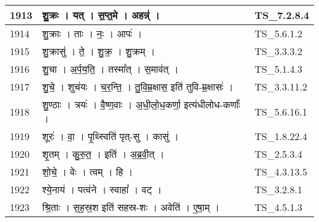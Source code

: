 \documentclass[17pt]{extarticle}
\begin{document}
\begin{longtable}{||p{0.4in}||p{4.9in}||p{0.9in}||}
    \hline
        
    1913 & शु॒क्रः   ।   यत्   ।   स॒प्त॒मे   ।   अहन्न्॑   ।    & TS\_7.2.8.4       \\
    
    \hline
        
    1914 & शु॒क्राः   ।   ताः   ।   नः॒   ।   आपः॑   ।    & TS\_5.6.1.2       \\
    
    \hline
        
    1915 & शु॒क्रासु॑   ।   ते॒   ।   शु॒क्र॒   ।   शु॒क्रम्   ।    & TS\_3.3.3.2       \\
    
    \hline
        
    1916 & शु॒चा   ।   अ॒र्प॒य॒ति॒   ।   तस्मा᳚त्   ।   स॒माव॑त्   ।    & TS\_5.1.4.3       \\
    
    \hline
        
    1917 & शु॒चे॒   ।   शुच॑यः   ।   च॒र॒न्ति॒   ।   तु॒वि॒म्र॒क्षास॒ इति॑ तुवि{-}म्र॒क्षासः॑   ।    & TS\_3.3.11.2       \\
    
    \hline
        
    1918 & शु॒ण्ठाः   ।   त्रयः॑   ।   वै॒ष्ण॒वाः   ।   अ॒धी॒लो॒ध॒कर्णा॒ इत्य॑धीलोध{-}कर्णाः᳚   ।    & TS\_5.6.16.1       \\
    
    \hline
        
    1919 & शूरः॑   ।   वा॒   ।   पृ॒थ्स्विति॑ पृत्{-}सु   ।   कासु॑   ।    & TS\_1.8.22.4       \\
    
    \hline
        
    1920 & शृ॒तम्   ।   कु॒रु॒त॒   ।   इति॑   ।   अ॒ब्र॒वी॒त्   ।    & TS\_2.5.3.4       \\
    
    \hline
        
    1921 & शो॒चे॒   ।   वेः   ।   त्वम्   ।   हि   ।    & TS\_4.3.13.5       \\
    
    \hline
        
    1922 & श्ये॒नाय॑   ।   पत्व॑ने   ।   स्वाहा᳚   ।   वट्   ।    & TS\_3.2.8.1       \\
    
    \hline
        
    1923 & श्रि॒ताः   ।   स॒ह॒स्र॒श इति॑ सहस्र{-}शः   ।   अवेति॑   ।   ए॒षा॒म्   ।    & TS\_4.5.1.3       \\
    

\end{longtable}
\end{document}
